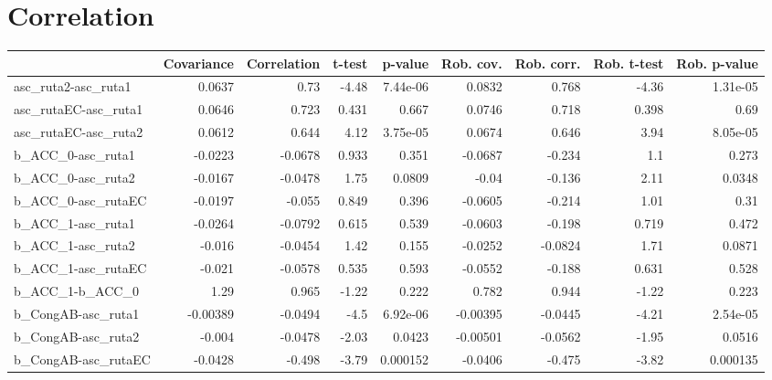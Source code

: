 \section{Correlation}
\begin{tabular}{lrrrrrrrr}
\toprule
{} &  Covariance &  Correlation &  t-test &  p-value &  Rob. cov. &  Rob. corr. &  Rob. t-test &  Rob. p-value \\
\midrule
asc\_ruta2-asc\_ruta1   &      0.0637 &         0.73 &   -4.48 & 7.44e-06 &     0.0832 &       0.768 &        -4.36 &      1.31e-05 \\
asc\_rutaEC-asc\_ruta1  &      0.0646 &        0.723 &   0.431 &    0.667 &     0.0746 &       0.718 &        0.398 &          0.69 \\
asc\_rutaEC-asc\_ruta2  &      0.0612 &        0.644 &    4.12 & 3.75e-05 &     0.0674 &       0.646 &         3.94 &      8.05e-05 \\
b\_ACC\_0-asc\_ruta1     &     -0.0223 &      -0.0678 &   0.933 &    0.351 &    -0.0687 &      -0.234 &          1.1 &         0.273 \\
b\_ACC\_0-asc\_ruta2     &     -0.0167 &      -0.0478 &    1.75 &   0.0809 &      -0.04 &      -0.136 &         2.11 &        0.0348 \\
b\_ACC\_0-asc\_rutaEC    &     -0.0197 &       -0.055 &   0.849 &    0.396 &    -0.0605 &      -0.214 &         1.01 &          0.31 \\
b\_ACC\_1-asc\_ruta1     &     -0.0264 &      -0.0792 &   0.615 &    0.539 &    -0.0603 &      -0.198 &        0.719 &         0.472 \\
b\_ACC\_1-asc\_ruta2     &      -0.016 &      -0.0454 &    1.42 &    0.155 &    -0.0252 &     -0.0824 &         1.71 &        0.0871 \\
b\_ACC\_1-asc\_rutaEC    &      -0.021 &      -0.0578 &   0.535 &    0.593 &    -0.0552 &      -0.188 &        0.631 &         0.528 \\
b\_ACC\_1-b\_ACC\_0       &        1.29 &        0.965 &   -1.22 &    0.222 &      0.782 &       0.944 &        -1.22 &         0.223 \\
b\_CongAB-asc\_ruta1    &    -0.00389 &      -0.0494 &    -4.5 & 6.92e-06 &   -0.00395 &     -0.0445 &        -4.21 &      2.54e-05 \\
b\_CongAB-asc\_ruta2    &      -0.004 &      -0.0478 &   -2.03 &   0.0423 &   -0.00501 &     -0.0562 &        -1.95 &        0.0516 \\
b\_CongAB-asc\_rutaEC   &     -0.0428 &       -0.498 &   -3.79 & 0.000152 &    -0.0406 &      -0.475 &        -3.82 &      0.000135 \\

\end{tabular}
